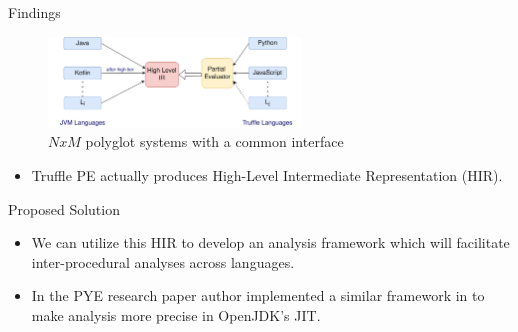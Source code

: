 \begin{frame}{Findings}
    \begin{figure}[h]
        \centering
        \includegraphics[width=0.6\textwidth]{images/common_interface}
        \caption{$NxM$ polyglot systems with a common interface}\label{fig:figure2}
    \end{figure}

    \begin{itemize}
        \item Truffle PE actually produces High-Level Intermediate Representation (HIR).
    \end{itemize}
\end{frame}
\begin{frame}{Proposed Solution}
    \begin{itemize}
        \item We can utilize this HIR to develop an analysis framework which will facilitate inter-procedural analyses across languages.
        \vspace{2mm}
        \item In the PYE research paper author implemented a similar framework in to make analysis more precise in OpenJDK's JIT.
        \vspace{2mm}
    \end{itemize}
\end{frame}

